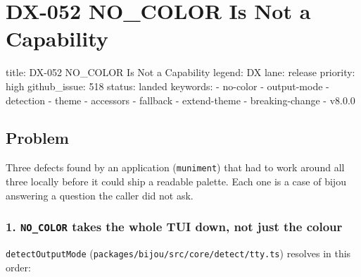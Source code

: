 \chapter{DX-052 NO\_COLOR Is Not a Capability}\label{record-147}

\smallskip

\begin{RecordMeta}
title: DX-052 NO_COLOR Is Not a Capability
legend: DX
lane: release
priority: high
github_issue: 518
status: landed
keywords:
  - no-color
  - output-mode
  - detection
  - theme
  - accessors
  - fallback
  - extend-theme
  - breaking-change
  - v8.0.0

\end{RecordMeta}

\section{Problem}\label{record-147-problem}

Three defects found by an application (\texttt{m\allowbreak{}u\allowbreak{}n\allowbreak{}i\allowbreak{}m\allowbreak{}e\allowbreak{}n\allowbreak{}t}) that had to work around all three locally before it could ship a readable palette. Each one is a case of bijou answering a question the caller did not ask.

\subsection{\texorpdfstring{1. \texttt{N\allowbreak{}O\allowbreak{}\_\allowbreak{}C\allowbreak{}O\allowbreak{}L\allowbreak{}O\allowbreak{}R} takes the whole TUI down, not just the colour}{1.  takes the whole TUI down, not just the colour}}\label{record-147-no_color-takes-the-whole-tui-down-not-just-the-colour}

\texttt{d\allowbreak{}e\allowbreak{}t\allowbreak{}e\allowbreak{}c\allowbreak{}t\allowbreak{}O\allowbreak{}u\allowbreak{}t\allowbreak{}p\allowbreak{}u\allowbreak{}t\allowbreak{}M\allowbreak{}o\allowbreak{}d\allowbreak{}e} (\texttt{p\allowbreak{}a\allowbreak{}c\allowbreak{}k\allowbreak{}a\allowbreak{}g\allowbreak{}e\allowbreak{}s\allowbreak{}/\allowbreak{}b\allowbreak{}i\allowbreak{}j\allowbreak{}o\allowbreak{}u\allowbreak{}/\allowbreak{}s\allowbreak{}r\allowbreak{}c\allowbreak{}/\allowbreak{}c\allowbreak{}o\allowbreak{}r\allowbreak{}e\allowbreak{}/\allowbreak{}d\allowbreak{}e\allowbreak{}t\allowbreak{}e\allowbreak{}c\allowbreak{}t\allowbreak{}/\allowbreak{}t\allowbreak{}t\allowbreak{}y\allowbreak{}.\allowbreak{}t\allowbreak{}s}) resolves in this order:

